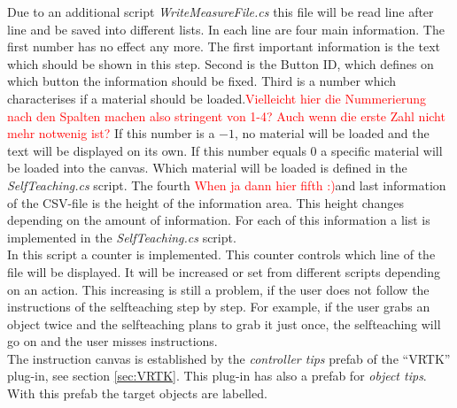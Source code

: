 Due to an additional script \textit{WriteMeasureFile.cs} this file will be read line after line and be saved into different lists. In each line are four main information. The first number has no effect any more. The first important information is the text which should be shown in this step. Second is the Button ID, which defines on which button the information should be fixed. Third is a number which characterises if a material should be loaded.\textcolor{red}{Vielleicht hier die Nummerierung nach den Spalten machen also stringent von 1-4? Auch wenn die erste Zahl nicht mehr notwenig ist?} If this number is a $-1$, no material will be loaded and the text will be displayed on its own. If this number equals $0$ a specific material will be loaded into the canvas. Which material will be loaded is defined in the \textit{SelfTeaching.cs }script. The fourth \textcolor{red}{When ja dann hier fifth :)}and last information of the CSV-file is the height of the information area. This height changes depending on the amount of information. For each of this information a list is implemented in the \textit{SelfTeaching.cs} script.\\
In this script a counter is implemented. This counter controls which line of the file will be displayed. It will be increased or set from different scripts depending on an action. This increasing is still a problem, if the user does not follow the instructions of the selfteaching step by step. For example, if the user grabs an object twice and the selfteaching plans to grab it just once, the selfteaching will go on and the user misses instructions. \\
The instruction canvas is established by the \textit{controller tips} prefab of the ``VRTK'' plug-in, see section \ref{sec:VRTK}. This plug-in has also a prefab for \textit{object tips}. With this prefab the target objects are labelled.


\newpage